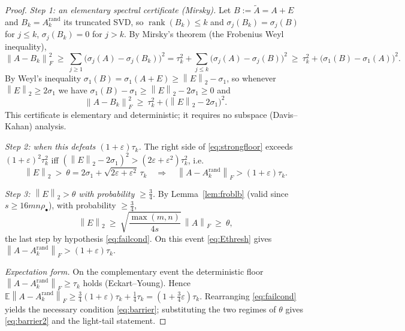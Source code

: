 \documentclass{amsart}
\theoremstyle{definition}
\DeclareMathOperator{\rank}{rank}
\newcommand{\Frob}[1]{\left\lVert #1\right\rVert_F}
\newcommand{\Op}[1]{\left\lVert #1\right\rVert_2}
\newcommand{\Atil}{\widetilde{A}}
\newcommand{\E}{\mathbb{E}}
\begin{document}
\begin{proof}
\emph{Step 1: an elementary spectral certificate (Mirsky).} Let $B:=\Atil=A+E$
and $B_k=A_k^{\mathrm{rand}}$ its truncated SVD, so $\rank(B_k)\le k$ and
$\sigma_j(B_k)=\sigma_j(B)$ for $j\le k$, $\sigma_j(B_k)=0$ for $j>k$. By
Mirsky's theorem (the Frobenius Weyl inequality),
\begin{equation}\label{eq:mirsky}
\Frob{A-B_k}^2\ \ge\ \sum_{j\ge1}\big(\sigma_j(A)-\sigma_j(B_k)\big)^2
=\tau_k^2+\sum_{j\le k}\big(\sigma_j(A)-\sigma_j(B)\big)^2
\ \ge\ \tau_k^2+\big(\sigma_1(B)-\sigma_1(A)\big)^2 .
\end{equation}
By Weyl's inequality $\sigma_1(B)=\sigma_1(A+E)\ge\Op E-\sigma_1$, so whenever
$\Op E\ge2\sigma_1$ we have $\sigma_1(B)-\sigma_1\ge\Op E-2\sigma_1\ge0$ and
\begin{equation}\label{eq:strongfloor}
\Frob{A-B_k}^2\ \ge\ \tau_k^2+\big(\Op E-2\sigma_1\big)^2 .
\end{equation}
This certificate is elementary and deterministic; it requires no subspace
(Davis--Kahan) analysis.

\emph{Step 2: when this defeats $(1+\varepsilon)\tau_k$.} The right side of
\eqref{eq:strongfloor} exceeds $(1+\varepsilon)^2\tau_k^2$ iff
$(\Op E-2\sigma_1)^2>(2\varepsilon+\varepsilon^2)\tau_k^2$, i.e.
\begin{equation}\label{eq:Ethresh}
\Op E\ >\ \theta=2\sigma_1+\sqrt{2\varepsilon+\varepsilon^2}\,\tau_k
\quad\Longrightarrow\quad
\Frob{A-A_k^{\mathrm{rand}}}>(1+\varepsilon)\tau_k .
\end{equation}

\emph{Step 3: $\Op E>\theta$ with probability $\ge\tfrac34$.} By
Lemma~\ref{lem:froblb} (valid since $s\ge16mn\rho_\bullet$), with probability
$\ge\tfrac34$,
\[
\Op E\ \ge\ \sqrt{\frac{\max(m,n)}{4s}}\,\Frob A\ \ge\ \theta,
\]
the last step by hypothesis \eqref{eq:failcond}. On this event
\eqref{eq:Ethresh} gives $\Frob{A-A_k^{\mathrm{rand}}}>(1+\varepsilon)\tau_k$.

\emph{Expectation form.} On the complementary event the deterministic floor
$\Frob{A-A_k^{\mathrm{rand}}}\ge\tau_k$ holds (Eckart--Young). Hence
$\E\Frob{A-A_k^{\mathrm{rand}}}\ge\tfrac34(1+\varepsilon)\tau_k+\tfrac14\tau_k
=(1+\tfrac34\varepsilon)\tau_k$. Rearranging \eqref{eq:failcond} yields the
necessary condition \eqref{eq:barrier}; substituting the two regimes of $\theta$
gives \eqref{eq:barrier2} and the light-tail statement.
\end{proof}
\end{document}
